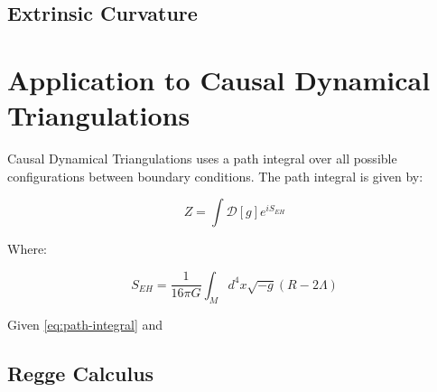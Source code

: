\documentclass{article}
\begin{document}
\subsection{Extrinsic Curvature}

\section{Application to Causal Dynamical Triangulations}

Causal Dynamical Triangulations uses a path integral over all possible
configurations between boundary conditions. The path integral is given
by:

\begin{equation}
  \label{eq:path-integral}
Z=\int \mathcal{D}[g]e^{iS_ {EH}}
\end{equation}

Where:

\begin{equation}
  \label{eq:einstein-hilbert-action}
  S_{EH}=\frac{1}{16\pi G}\int_{M}d^4 x\sqrt{-g}\left(R-2\Lambda\right)
\end{equation}

Given \eqref{eq:path-integral} and \cite{kommu2011} 

\subsection{Regge Calculus}





\end{document}
